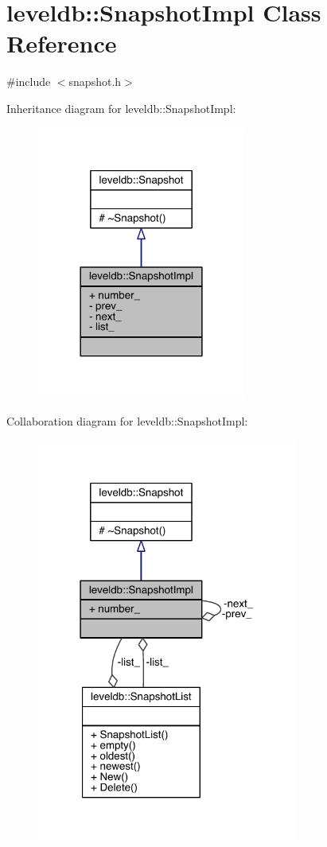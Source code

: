 \hypertarget{classleveldb_1_1_snapshot_impl}{}\section{leveldb\+:\+:Snapshot\+Impl Class Reference}
\label{classleveldb_1_1_snapshot_impl}


{\ttfamily \#include $<$snapshot.\+h$>$}



Inheritance diagram for leveldb\+:\+:Snapshot\+Impl\+:\nopagebreak
\begin{figure}[H]
\begin{center}
\leavevmode
\includegraphics[width=194pt]{classleveldb_1_1_snapshot_impl__inherit__graph}
\end{center}
\end{figure}


Collaboration diagram for leveldb\+:\+:Snapshot\+Impl\+:\nopagebreak
\begin{figure}[H]
\begin{center}
\leavevmode
\includegraphics[width=243pt]{classleveldb_1_1_snapshot_impl__coll__graph}
\end{center}
\end{figure}
